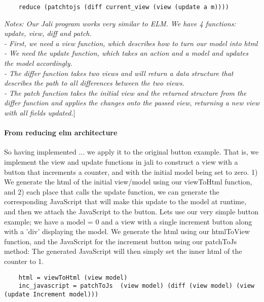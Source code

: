 \begin{verbatim}
    reduce (patchtojs (diff current_view (view (update a m))))
\end{verbatim}





\textit{Notes: Our Jali program works very similar to ELM. We have 4 functions: update, view, diff and patch. \\
- First, we need a view function, which describes how to turn our model into \gls{html}\\
- We need the update function, which takes an action and a model and updates the model accordingly. \\
- The differ function takes two views and will return a data structure that describes the path to all differences between the two views.\\
- The patch function takes the initial view and the returned structure from the differ function and applies the changes onto the passed view, returning a new view with all fields updated.}]





\paragraph{From reducing elm architecture}

So having implemented ... we apply it to the original button example. That is, we implement the view and update functions in jali to construct a view with a button that increments a counter, and with the initial model being set to zero.
1) We generate the html of the initial view/model using our viewToHtml function, and
2) each place that calls the update function, we can generate the corresponding JavaScript that will make this update to the model at runtime, and then we attach the JavaScript to the button. Lets use our very simple button example; we have a model = 0 and a view with a single increment button along with a 'div' displaying the model. We generate the html using our htmlToView function, and the JavaScript for the increment button using our patchToJs method: The generated JavaScript will then simply set the inner html of the counter to 1.

\begin{verbatim}
    html = viewToHtml (view model)
    inc_javascript = patchToJs  (view model) (diff (view model) (view (update Increment model)))
\end{verbatim}

